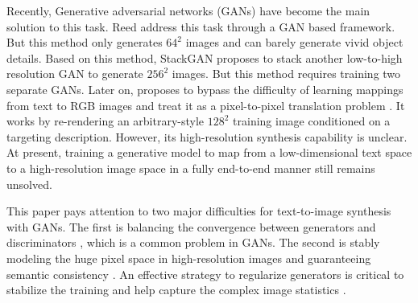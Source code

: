 \documentclass[10pt,twocolumn,letterpaper]{article}
\begin{document}

Recently, Generative adversarial networks (GANs) have become the main solution to this task. 
Reed \etal \cite{reed2016generative} address this task through a GAN based framework. But this method only generates $64^2$ images and can barely generate vivid object details.
Based on this method, StackGAN \cite{han2017stackgan} proposes to stack another low-to-high resolution GAN to generate $256^2$ images. But this method requires training two separate GANs. Later on, \cite{dong2017semantic} proposes to bypass the difficulty of learning mappings from text to RGB images and treat it as a pixel-to-pixel translation problem \cite{isola2016image}. It works by re-rendering an arbitrary-style $128^2$ training image conditioned on a targeting description. 
However, its high-resolution synthesis capability is unclear. 
At present, training a generative model to map from a low-dimensional text space to a high-resolution image space in a fully end-to-end manner still remains unsolved. 

This paper pays attention to two major difficulties for text-to-image synthesis with GANs. The first is balancing the convergence between generators and discriminators \cite{goodfellow2014generative,improvedGAN}, which is a common problem in GANs. The second is stably modeling the huge pixel space in high-resolution images and guaranteeing semantic consistency \cite{han2017stackgan}. 
An effective strategy to regularize generators is critical to stabilize the training and help capture the complex image statistics \cite{huang2016stacked}. 
\end{document}
